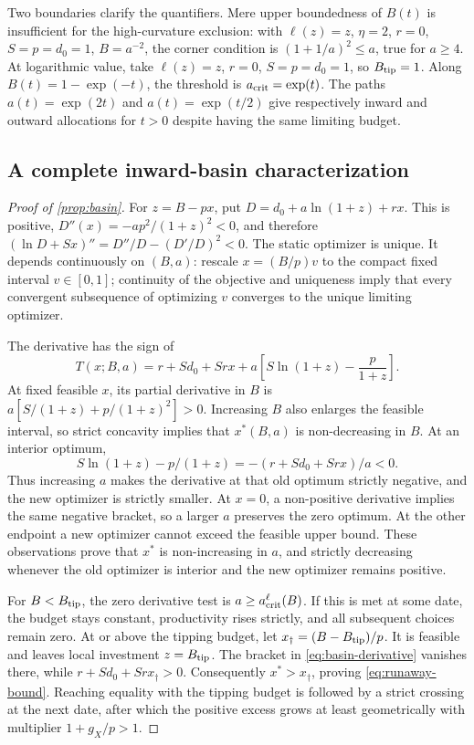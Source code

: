 \documentclass[11pt,a4paper]{article}
\theoremstyle{definition}\newtheorem{definition}{Definition}
\begin{document}
Two boundaries clarify the quantifiers. Mere upper boundedness of
$B(t)$ is insufficient for the high-curvature exclusion: with
$\ell(z)=z$, $\eta=2$, $r=0$, $S=p=d_0=1$, $B=a^{-2}$, the
corner condition is $(1+1/a)^2\leq a$, true for $a\geq4$.
At logarithmic value, take $\ell(z)=z$, $r=0$, $S=p=d_0=1$,
so $B_{\rm tip}=1$. Along $B(t)=1-\exp(-t)$, the threshold is
$a_{\rm crit}=\exp(t)$. The paths $a(t)=\exp(2t)$ and
$a(t)=\exp(t/2)$ give respectively inward and outward allocations
for $t>0$ despite having the same limiting budget.

\subsection{A complete inward-basin characterization}
\label{app:basin-proof}
\begin{proof}[Proof of \cref{prop:basin}]
For $z=B-px$, put $D=d_0+a\ln(1+z)+rx$. This is positive,
$D''(x)=-ap^2/(1+z)^2<0$, and therefore
$(\ln D+Sx)''=D''/D-(D'/D)^2<0$.
The static optimizer is unique. It depends continuously on $(B,a)$:
rescale $x=(B/p)v$ to the compact fixed interval $v\in[0,1]$;
continuity of the objective and uniqueness imply that every convergent
subsequence of optimizing $v$ converges to the unique limiting
optimizer.

The derivative has the sign of
\begin{equation}
 T(x;B,a)=r+Sd_0+Sr x+
       a\left[S\ln(1+z)-\frac{p}{1+z}\right].
 \label{eq:basin-derivative}
\end{equation}
At fixed feasible $x$, its partial derivative in $B$ is
$a[S/(1+z)+p/(1+z)^2]>0$. Increasing $B$ also enlarges the
feasible interval, so strict concavity implies that $x^*(B,a)$ is
non-decreasing in $B$. At an interior optimum,
\[
 S\ln(1+z)-p/(1+z)=-(r+Sd_0+Sr x)/a<0.
\]
Thus increasing $a$ makes the derivative at that old optimum strictly
negative, and the new optimizer is strictly smaller. At $x=0$, a
non-positive derivative implies the same negative bracket, so a larger
$a$ preserves the zero optimum. At the other endpoint a new optimizer
cannot exceed the feasible upper bound. These observations prove that
$x^*$ is non-increasing in $a$, and strictly decreasing whenever the
old optimizer is interior and the new optimizer remains positive.

For $B<B_{\rm tip}$, the zero derivative test is
$a\geq a_{\rm crit}^{\ell}(B)$. If this is met at some date, the
budget stays constant, productivity rises strictly, and all subsequent
choices remain zero. At or above the tipping budget, let
$x_\dagger=(B-B_{\rm tip})/p$. It is feasible and leaves local
investment $z=B_{\rm tip}$. The bracket in \cref{eq:basin-derivative}
vanishes there, while $r+Sd_0+Sr x_\dagger>0$.
Consequently $x^*>x_\dagger$, proving \cref{eq:runaway-bound}.
Reaching equality with the tipping budget is followed by a strict
crossing at the next date, after which the positive excess grows at
least geometrically with multiplier $1+g_X/p>1$.


\end{proof}
\end{document}
